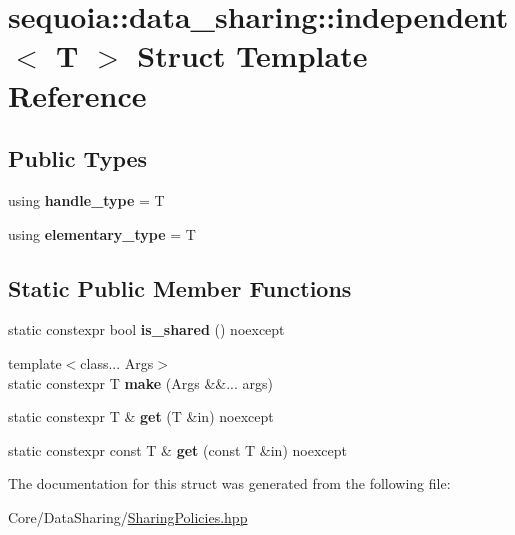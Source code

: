\hypertarget{structsequoia_1_1data__sharing_1_1independent}{}\section{sequoia\+::data\+\_\+sharing\+::independent$<$ T $>$ Struct Template Reference}
\label{structsequoia_1_1data__sharing_1_1independent}
\subsection*{Public Types}
\begin{DoxyCompactItemize}
\item 
\mbox{\label{structsequoia_1_1data__sharing_1_1independent_a14ea1054e39f23535088c2620b844fc4}} 
using {\bfseries handle\+\_\+type} = T
\item 
\mbox{\label{structsequoia_1_1data__sharing_1_1independent_a5ff719552bec9cc4acbd74a007217a12}} 
using {\bfseries elementary\+\_\+type} = T
\end{DoxyCompactItemize}
\subsection*{Static Public Member Functions}
\begin{DoxyCompactItemize}
\item 
\mbox{\label{structsequoia_1_1data__sharing_1_1independent_a70b033da0a8af2dbe87adbc5d3de6bc2}} 
static constexpr bool {\bfseries is\+\_\+shared} () noexcept
\item 
\mbox{\label{structsequoia_1_1data__sharing_1_1independent_a2d6ed5ad84aeab476f7a07313938a2f6}} 
{\footnotesize template$<$class... Args$>$ }\\static constexpr T {\bfseries make} (Args \&\&... args)
\item 
\mbox{\label{structsequoia_1_1data__sharing_1_1independent_a75c1aabc6f8a3d39ddb3fd660cd8c34c}} 
static constexpr T \& {\bfseries get} (T \&in) noexcept
\item 
\mbox{\label{structsequoia_1_1data__sharing_1_1independent_a735bbc097a7d557f1cd1b82b3923f694}} 
static constexpr const T \& {\bfseries get} (const T \&in) noexcept
\end{DoxyCompactItemize}


The documentation for this struct was generated from the following file\+:\begin{DoxyCompactItemize}
\item 
Core/\+Data\+Sharing/\mbox{\hyperlink{_sharing_policies_8hpp}{Sharing\+Policies.\+hpp}}\end{DoxyCompactItemize}

